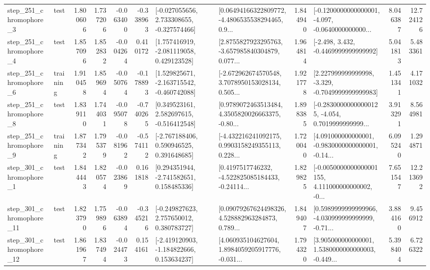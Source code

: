 \begin{tabular}{llrrrrllrlrr}
   step\_251\_chromophore\_3 &      test &      1.800606 &    1.737206 &     -0.063400 & -0.338963 &   [-0.027055656, 2.733308655, -0.327574466] &  [0.06494166322809772, -4.4806535538294465, 0.9... &       1.844940 &  [-0.1200000000000001, -4.097, -0.0640000000000... &            8.046387 &         12.724126 \\
   step\_251\_chromophore\_4 &      test &      1.857096 &    1.852832 &     -0.004264 &  0.410172 &    [1.757416919, -2.081119058, 0.429123528] &  [2.8755827923295763, -3.657985840304879, 0.077... &       1.964814 &               [-2.498, 3.432, -0.4469999999999992] &            5.041813 &          5.483361 \\
   step\_251\_chromophore\_6 &  training &      1.910458 &    1.859694 &     -0.050764 & -0.178893 &   [1.529825671, -2.163715542, -0.460742088] &  [-2.672962674570548, 3.7078950153028134, 0.505... &       1.921778 &   [2.227999999999998, -3.329, -0.7049999999999983] &            1.451341 &          4.171032 \\
   step\_251\_chromophore\_8 &      test &      1.839110 &    1.744031 &     -0.095078 & -0.740265 &    [0.349523161, 2.582697615, -0.516412548] &  [0.9789072463513484, 4.3505820026663375, -0.80... &       1.898385 &  [-0.28300000000000125, -4.054, 0.7019999999999... &            3.913291 &          8.564981 \\
   step\_251\_chromophore\_9 &  training &      1.877342 &    1.795379 &     -0.081962 & -0.574112 &    [-2.767188406, 0.590946525, 0.391648685] &  [-4.432216241092175, 0.9903158249355113, 0.228... &       1.720040 &  [4.091000000000001, -0.9830000000000001, -0.14... &            6.095240 &          1.294871 \\
   step\_301\_chromophore\_1 &      test &      1.844443 &    1.820574 &     -0.023869 &  0.161818 &    [0.294351944, -2.741582651, 0.158485336] &  [0.4197517746232, -4.522825085184433, -0.24114... &       1.829825 &  [-0.0050000000000001155, 4.111000000000002, -0... &            7.651547 &         12.213692 \\
  step\_301\_chromophore\_11 &      test &      1.823790 &    1.759896 &     -0.063894 & -0.345216 &    [-0.249827623, 2.757650012, 0.380783727] &  [0.09079267624498326, 4.528882963284873, 0.789... &       1.849407 &  [0.5989999999999966, -4.030999999999999, -0.71... &            3.884160 &          9.456912 \\
  step\_301\_chromophore\_12 &      test &      1.861967 &    1.837494 &     -0.024473 &  0.154161 &   [-2.419120903, -1.184822666, 0.153634237] &  [4.060935104627604, 1.8984059205917776, -0.031... &       1.794320 &  [3.905000000000001, 1.5380000000000003, -0.449... &            5.398404 &          6.726322 \\

\end{tabular}
